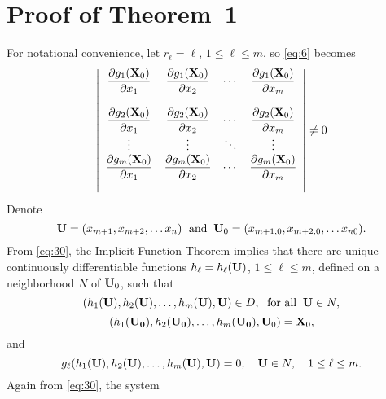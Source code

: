 \documentclass{article}
\newcommand{\proof}{\noindent{\sc\bf Proof}\quad }
\newcommand{\dst}{\displaystyle}
\begin{document}
\section{Proof of Theorem~1} \label{section:6}
\proof
For notational convenience, let $r_{\ell}=\ell$,
$1\le \ell\le m$, so \eqref{eq:6} becomes
\begin{equation} \label{eq:30}
\left|\begin{array}{ccccccc}
\dst{\frac{\partial{g_{1}({\bf X}_{0})}}{\partial{x_{1}}}}&
\dst{\frac{\partial{g_{1}({\bf X}_{0})}}{\partial{x_{2}}}}&
\cdots&
\dst{\frac{\partial{g_{1}({\bf X}_{0})}}{\partial{x_{m}}}}\\ \\
\dst{\frac{\partial{g_{2}({\bf X}_{0})}}{\partial{x_{1}}}}&
\dst{\frac{\partial{g_{2}({\bf X}_{0})}}{\partial{x_{2}}}}&
\cdots&
\dst{\frac{\partial{g_{2}({\bf X}_{0})}}{\partial{x_{m}}}}\\
\vdots&\vdots&\ddots&\vdots\\
\dst{\frac{\partial{g_{m}({\bf X}_{0})}}{\partial{x_{1}}}}&
\dst{\frac{\partial{g_{m}({\bf X}_{0})}}{\partial{x_{2}}}}&
\cdots&
\dst{\frac{\partial{g_{m}({\bf X}_{0})}}{\partial{x_{m}}}}\\ \\
\end{array}\right|\ne0
\end{equation}
 Denote
$$
{\bf U}=(x_{m+1},x_{m+2},\dots x_{n})\text{\; and\;\;}
{\bf U}_{0}=(x_{m+1,0},x_{m+2,0},\dots x_{n0}).
$$
From \eqref{eq:30}, the   Implicit Function Theorem
implies
that there  are unique continuously differentiable functions
$h_{\ell}=h_{\ell}({\bf U})$, $1\le \ell\le m$,
 defined on a neighborhood $N$ of
${\bf U}_{0}$,  such that
$$
(h_{1}({\bf U}),h_{2}({\bf U}),\dots, h_{m}({\bf U}),
{\bf U})\in D,
\text{\; for all\;\;} {\bf U}\in N,
$$
\begin{equation} \label{eq:31}
(h_{1}({\bf U_{0}}),h_{2}({\bf U_{0}}),\dots, h_{m}({\bf U_{0}}),{\bf
U}_{0})={\bf X}_{0},
\end{equation}
and
\begin{equation} \label{eq:32}
g_{\ell}(h_{1}({\bf U}),h_{2}({\bf U}),\dots, h_{m}({\bf U}),{\bf
U})=0,\quad
 {\bf U}\in N, \quad 1\le \ell\le m.
\end{equation}
Again from   \eqref{eq:30}, the system
\end{document}
